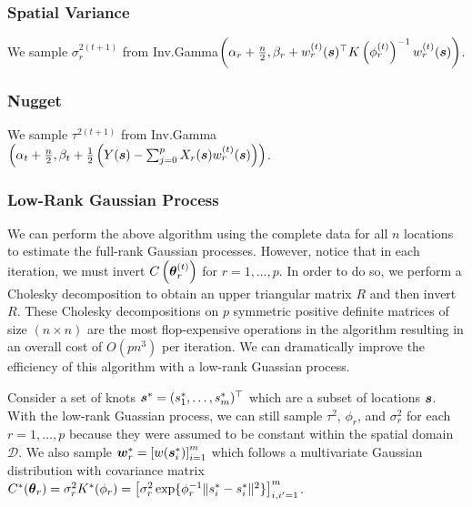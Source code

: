 \subsubsection{Spatial Variance}
\label{sec:spatial_variance}

We sample $\sigma_r^{2(t+1)}$ from Inv.Gamma$\left(\alpha_r + \frac{n}{2}, \beta_r + w_r^{(t)}(\boldsymbol{s})^{\top} K\left(\phi_r^{(t)}\right)^{-1} w_r^{(t)}(\boldsymbol{s})\right)$.

\subsubsection{Nugget}
\label{sec:nugget}

We sample $\tau^{2(t+1)}$ from Inv.Gamma$\left(\alpha_t + \frac{n}{2}, \beta_t + \frac{1}{2} \left(Y(\boldsymbol{s}) - \sum_{j=0}^p X_r(\boldsymbol{s})w_r^{(t)}(\boldsymbol{s}) \right)\right)$.

\subsubsection{Low-Rank Gaussian Process}
\label{sec:low_rank}

We can perform the above algorithm using the complete data for all $n$ locations to estimate the full-rank Gaussian processes. However, notice that in each iteration, we must invert $C\left(\boldsymbol{\theta}_r^{(t)}\right)$ for $r = 1, \dots, p$. In order to do so, we perform a Cholesky decomposition to obtain an upper triangular matrix $R$ and then invert $R$. These Cholesky decompositions on $p$ symmetric positive definite matrices of size $(n \times n)$ are the most flop-expensive operations in the algorithm resulting in an overall cost of $O(pn^3)$ per iteration. We can dramatically improve the efficiency of this algorithm with a low-rank Guassian process.

Consider a set of knots $\boldsymbol{s}^* = (s_1^*, \dots, s_m^*)^\top$ which are a subset of locations $\boldsymbol{s}$. With the low-rank Guassian process, we can still sample $\tau^2$, $\phi_r$, and $\sigma_r^2$ for each $r = 1, \dots, p$ because they were assumed to be constant within the spatial domain $\mathcal{D}$. We also sample $\boldsymbol{w}_r^* = \left[w(\boldsymbol{s}_i^*)\right]_{i=1}^m$ which follows a multivariate Gaussian distribution with covariance matrix $C^*(\boldsymbol{\theta}_r) = \sigma_r^2 K^*(\phi_r) = \left[ \sigma_r^2 \exp\{ \phi_r^{-1} \| s_{i}^* - s_{i}^* \|^2 \} \right]_{i, i' = 1}^m$.

